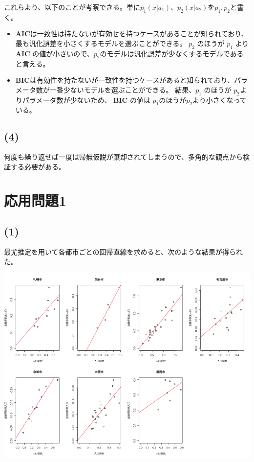 \documentclass[a4j,xelatex,ja=standard,jafont=hiragino-pron, 9pt]{bxjsarticle}
\let\origfigure=\figure
\let\endorigfigure=\endfigure
\renewenvironment{figure}[1][]{%
  \origfigure[H]
}{%
  \endorigfigure
}
\begin{document}
これらより、以下のことが考察できる。単に$p_1(x|a_1)$、$p_2(x|a_2)$を$p_1, p_2$と書く。

\begin{itemize}
  \item
    \textbf{AIC}は一致性は持たないが有効せを持つケースがあることが知られており、最も汎化誤差を小さくするモデルを選ぶことができる。
    $p_2$ のほうが $p_1$ より \textbf{AIC} の値が小さいので、$p_2$のモデルは汎化誤差が少なくするモデルであると言える。
  \item
    \textbf{BIC}は有効性を持たないが一致性を持つケースがあると知られており、パラメータ数が一番少ないモデルを選ぶことができる。
    結果、$p_1$ のほうが $p_2$よりパラメータ数が少ないため、 \textbf{BIC} の値は $p_1$のほうが$p_2$より小さくなっている。
\end{itemize}

\subsection*{(4)}

何度も繰り返せば一度は帰無仮説が棄却されてしまうので、多角的な観点から検証する必要がある。

\section*{応用問題1}

\subsection*{(1)}\label{section}

最尤推定を用いて各都市ごとの回帰直線を求めると、次のような結果が得られた。

\begin{figure}
\centering
\includegraphics[width=14cm]{../src/output/image/regression.png}
\caption{最尤推定法による推定}
\end{figure}
\end{document}
